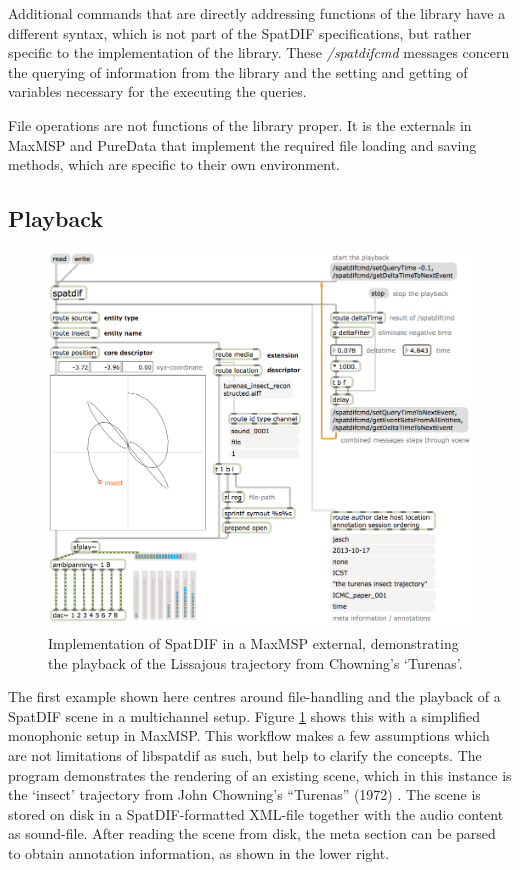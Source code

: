 \documentclass{article}
\begin{document}
Additional commands that are directly addressing functions of the library have a different syntax, which is not part of the SpatDIF specifications, but rather specific to the implementation of the library.
These \emph{/spatdifcmd} messages concern the querying of information from the library and the setting and getting of variables necessary for the executing the queries.

File operations are not functions of the library proper.
It is the externals in MaxMSP and PureData that implement the required file loading and saving methods, which are specific to their own environment. 


\subsection{Playback}\label{sec:playback}

\begin{figure}[httb]
	\includegraphics[width=\columnwidth]{recording_maxpatch.png}
	\caption{Implementation of SpatDIF in a MaxMSP external, demonstrating the playback of the Lissajous trajectory from Chowning's `Turenas'.} 
	\label{fig:screenshot}
\end{figure}

The first example shown here centres around file-handling and the playback of a SpatDIF scene in a multichannel setup.
Figure \ref{fig:screenshot} shows this with a simplified monophonic setup in MaxMSP.
This workflow makes a few assumptions which are not limitations of libspatdif as such, but help to clarify the concepts.
The program demonstrates the rendering of an existing scene, which in this instance is the `insect' trajectory from John Chowning's ``Turenas'' (1972) \cite{chowningturenas}.
The scene is stored on disk in a SpatDIF-formatted XML-file together with the audio content as sound-file.
After reading the scene from disk, the meta section can be parsed to obtain annotation information, as shown in the lower right.
\end{document}
